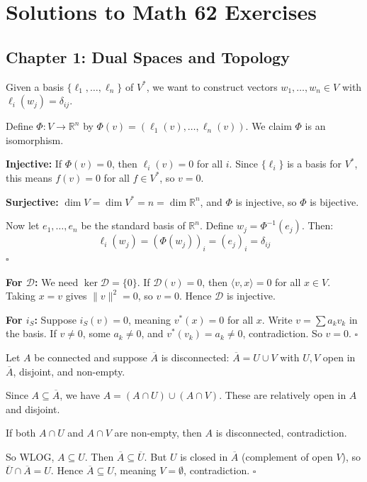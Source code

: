 \documentclass[11pt, letterpaper, openany]{book}
\newenvironment{solution}[1][Solution]{%
  \tcolorbox[blanker, breakable, left=1em,
    before skip=1em, after skip=1em,
    borderline west={2pt}{0pt}{MagicBlue},
    colback=MagicCream,
    before upper={\textcolor{MagicBlue}{\sffamily\bfseries #1.}\space}
  ]%
}{%
  \hfill\textcolor{MagicBlue}{\ensuremath{\square}}\endtcolorbox%
}
\begin{document}

\backmatter %

\chapter{Solutions to Math 62 Exercises}

\section*{Chapter 1: Dual Spaces and Topology}

\begin{solution}[1.1]
Given a basis $\{\ell_1, \ldots, \ell_n\}$ of $V^*$, we want to construct vectors $w_1, \ldots, w_n \in V$ with $\ell_i(w_j) = \delta_{ij}$.

Define $\Phi: V \to \mathbb{R}^n$ by $\Phi(v) = (\ell_1(v), \ldots, \ell_n(v))$. We claim $\Phi$ is an isomorphism.

\textbf{Injective:} If $\Phi(v) = 0$, then $\ell_i(v) = 0$ for all $i$. Since $\{\ell_i\}$ is a basis for $V^*$, this means $f(v) = 0$ for all $f \in V^*$, so $v = 0$.

\textbf{Surjective:} $\dim V = \dim V^* = n = \dim \mathbb{R}^n$, and $\Phi$ is injective, so $\Phi$ is bijective.

Now let $e_1, \ldots, e_n$ be the standard basis of $\mathbb{R}^n$. Define $w_j = \Phi^{-1}(e_j)$. Then:
\[
\ell_i(w_j) = (\Phi(w_j))_i = (e_j)_i = \delta_{ij}
\]
\end{solution}

\begin{solution}[1.3]
\textbf{For $\mathcal{D}$:} We need $\ker \mathcal{D} = \{0\}$. If $\mathcal{D}(v) = 0$, then $\langle v, x \rangle = 0$ for all $x \in V$. Taking $x = v$ gives $\|v\|^2 = 0$, so $v = 0$. Hence $\mathcal{D}$ is injective.

\textbf{For $i_S$:} Suppose $i_S(v) = 0$, meaning $v^*(x) = 0$ for all $x$. Write $v = \sum a_k v_k$ in the basis. If $v \neq 0$, some $a_k \neq 0$, and $v^*(v_k) = a_k \neq 0$, contradiction. So $v = 0$.
\end{solution}

\begin{solution}[1.5]
Let $A$ be connected and suppose $\overline{A}$ is disconnected: $\overline{A} = U \cup V$ with $U, V$ open in $\overline{A}$, disjoint, and non-empty.

Since $A \subseteq \overline{A}$, we have $A = (A \cap U) \cup (A \cap V)$. These are relatively open in $A$ and disjoint. 

If both $A \cap U$ and $A \cap V$ are non-empty, then $A$ is disconnected, contradiction.

So WLOG, $A \subseteq U$. Then $\overline{A} \subseteq \overline{U}$. But $U$ is closed in $\overline{A}$ (complement of open $V$), so $\overline{U} \cap \overline{A} = U$. Hence $\overline{A} \subseteq U$, meaning $V = \emptyset$, contradiction.
\end{solution}
\end{document}
